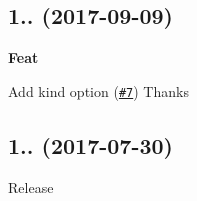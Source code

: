 \subsection*{1.. (2017-\/09-\/09)}


\begin{DoxyItemize}
\item {\bfseries Feat}
\begin{DoxyItemize}
\item Add {\ttfamily kind} option (\href{https://github.com/esdoc/esdoc-plugins/pull/7}{\tt \#7}) Thanks \href{https://github.com/jaxx2104}{\tt }
\end{DoxyItemize}
\end{DoxyItemize}

\subsection*{1.. (2017-\/07-\/30)}


\begin{DoxyItemize}
\item Release 
\end{DoxyItemize}